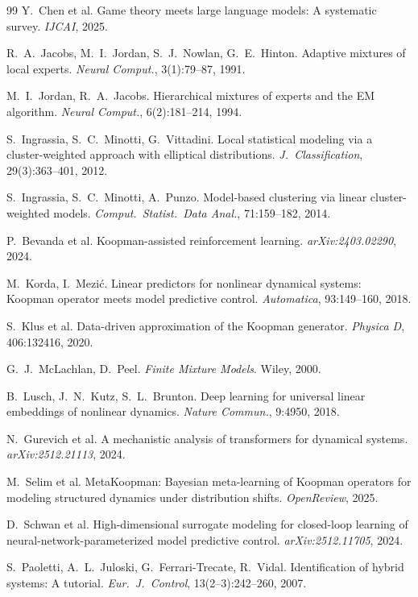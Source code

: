 \documentclass[11pt]{article}
\theoremstyle{definition}
\begin{document}
\begin{thebibliography}{99}
 Y.~Chen et al. Game theory meets large language models: A systematic survey. \textit{IJCAI}, 2025.

 R.~A.~Jacobs, M.~I.~Jordan, S.~J.~Nowlan, G.~E.~Hinton. Adaptive mixtures of local experts. \textit{Neural Comput.}, 3(1):79--87, 1991.

 M.~I.~Jordan, R.~A.~Jacobs. Hierarchical mixtures of experts and the EM algorithm. \textit{Neural Comput.}, 6(2):181--214, 1994.

 S.~Ingrassia, S.~C.~Minotti, G.~Vittadini. Local statistical modeling via a cluster-weighted approach with elliptical distributions. \textit{J.~Classification}, 29(3):363--401, 2012.

 S.~Ingrassia, S.~C.~Minotti, A.~Punzo. Model-based clustering via linear cluster-weighted models. \textit{Comput.\ Statist.\ Data Anal.}, 71:159--182, 2014.

 P.~Bevanda et al. Koopman-assisted reinforcement learning. \textit{arXiv:2403.02290}, 2024.

 M.~Korda, I.~Mezi{\'c}. Linear predictors for nonlinear dynamical systems: Koopman operator meets model predictive control. \textit{Automatica}, 93:149--160, 2018.

 S.~Klus et al. Data-driven approximation of the Koopman generator. \textit{Physica D}, 406:132416, 2020.

 G.~J.~McLachlan, D.~Peel. \textit{Finite Mixture Models}. Wiley, 2000.

 B.~Lusch, J.~N.~Kutz, S.~L.~Brunton. Deep learning for universal linear embeddings of nonlinear dynamics. \textit{Nature Commun.}, 9:4950, 2018.

 N.~Gurevich et al. A mechanistic analysis of transformers for dynamical systems. \textit{arXiv:2512.21113}, 2024.

 M.~Selim et al. MetaKoopman: Bayesian meta-learning of Koopman operators for modeling structured dynamics under distribution shifts. \textit{OpenReview}, 2025.

 D.~Schwan et al. High-dimensional surrogate modeling for closed-loop learning of neural-network-parameterized model predictive control. \textit{arXiv:2512.11705}, 2024.

 S.~Paoletti, A.~L.~Juloski, G.~Ferrari-Trecate, R.~Vidal. Identification of hybrid systems: A tutorial. \textit{Eur.\ J.~Control}, 13(2--3):242--260, 2007.


\end{thebibliography}
\end{document}
